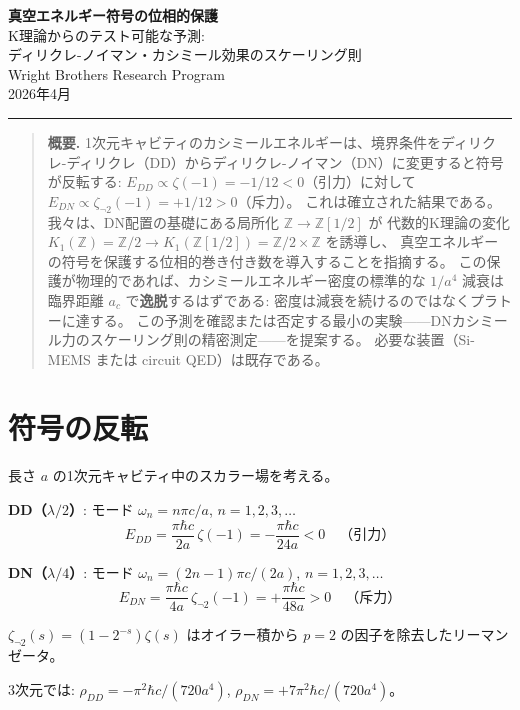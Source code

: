 \documentclass[11pt,a4paper]{article}
\begin{document}
\begin{center}
{\LARGE\bfseries 真空エネルギー符号の位相的保護}\\[0.3cm]
{\large K理論からのテスト可能な予測:\\
ディリクレ-ノイマン・カシミール効果のスケーリング則}\\[0.5cm]
{\large Wright Brothers Research Program}\\[0.2cm]
{2026年4月}\\[0.3cm]
\rule{12cm}{0.4pt}
\end{center}

\begin{quotation}
\noindent\textbf{概要.}\quad
1次元キャビティのカシミールエネルギーは、境界条件をディリクレ-ディリクレ（DD）からディリクレ-ノイマン（DN）に変更すると符号が反転する:
$E_{DD} \propto \zeta(-1) = -1/12 < 0$（引力）に対して $E_{DN} \propto \zeta_{\neg 2}(-1) = +1/12 > 0$（斥力）。
これは確立された結果である。
我々は、DN配置の基礎にある局所化 $\mathbb{Z} \to \mathbb{Z}[1/2]$ が
代数的K理論の変化 $K_1(\mathbb{Z}) = \mathbb{Z}/2 \to K_1(\mathbb{Z}[1/2]) = \mathbb{Z}/2 \times \mathbb{Z}$ を誘導し、
真空エネルギーの符号を保護する位相的巻き付き数を導入することを指摘する。
この保護が物理的であれば、カシミールエネルギー密度の標準的な $1/a^4$ 減衰は
臨界距離 $a_c$ で\textbf{逸脱}するはずである:
密度は減衰を続けるのではなくプラトーに達する。
この予測を確認または否定する最小の実験——DNカシミール力のスケーリング則の精密測定——を提案する。
必要な装置（Si-MEMS または circuit QED）は既存である。
\end{quotation}

\section{符号の反転}

長さ $a$ の1次元キャビティ中のスカラー場を考える。

\textbf{DD（$\lambda/2$）}: モード $\omega_n = n\pi c/a$, $n=1,2,3,\ldots$
$$E_{DD} = \frac{\pi\hbar c}{2a}\,\zeta(-1) = -\frac{\pi\hbar c}{24a} < 0 \quad\text{（引力）}$$

\textbf{DN（$\lambda/4$）}: モード $\omega_n = (2n-1)\pi c/(2a)$, $n=1,2,3,\ldots$
$$E_{DN} = \frac{\pi\hbar c}{4a}\,\zeta_{\neg 2}(-1) = +\frac{\pi\hbar c}{48a} > 0 \quad\text{（斥力）}$$

$\zeta_{\neg 2}(s) = (1-2^{-s})\zeta(s)$ はオイラー積から $p=2$ の因子を除去したリーマンゼータ。

3次元では: $\rho_{DD} = -\pi^2\hbar c/(720a^4)$, $\rho_{DN} = +7\pi^2\hbar c/(720a^4)$。
\end{document}
